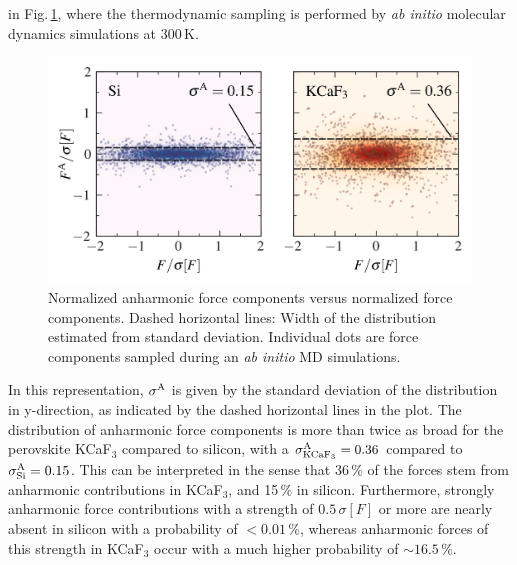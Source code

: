  in Fig.\,\ref{fig:anh.sigmaA}, where the thermodynamic sampling is performed by \emph{ab initio} molecular dynamics simulations at 300\,K.
\begin{figure}
	\includegraphics[width=\textwidth]{./data/plots/anharmonicity/5_density_plots/histogram_annotated.png}
	\caption{
		Normalized anharmonic force components versus normalized force components. Dashed horizontal lines: Width of the distribution estimated from standard deviation. Individual dots are force components sampled during an \emph{ab initio} MD simulations.
	}
	\label{fig:anh.sigmaA}
\end{figure}
In this representation, $\sigma^\mathrm{A}$ is given by the standard deviation of the distribution in y-direction, as indicated by the dashed horizontal lines in the plot. The distribution of anharmonic force components is more than twice as broad for the perovskite KCaF$_3$ compared to silicon, with a $\sigma^\mathrm{A}_{\rm KCaF_3} = 0.36$ compared to $\sigma^\mathrm{A}_{\rm Si} = 0.15$. This can be interpreted in the sense that 36\,\% of the forces stem from anharmonic contributions in KCaF$_3$, and 15\,\% in silicon. Furthermore, strongly anharmonic force contributions with a strength of $0.5\,\sigma [F]$ or more are nearly absent in silicon with a probability of $<0.01\,\%$, whereas anharmonic forces of this strength in KCaF$_3$ occur with a much higher probability of $\sim 16.5\,\%$.


